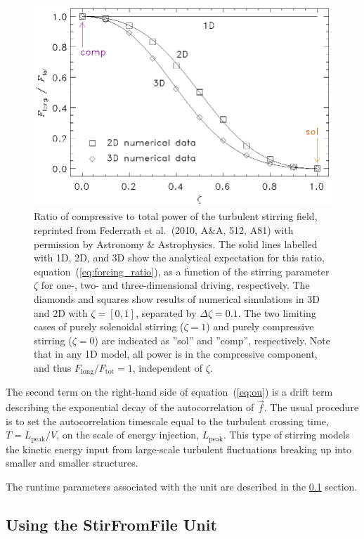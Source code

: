 \begin{figure}[t]
\centerline{\includegraphics[width=0.6\linewidth]{federrath_stirring_ratio}}
\caption{Ratio of compressive to total power of the turbulent stirring field, reprinted from Federrath
et al.~(2010, A\&A, 512, A81) with permission by Astronomy \& Astrophysics. The solid lines labelled
with 1D, 2D, and 3D show the analytical expectation for this ratio, equation~(\ref{eq:forcing_ratio}),
as a function of the stirring parameter $\zeta$ for one-, two- and three-dimensional driving,
respectively. The diamonds and squares show results of numerical simulations in 3D and 2D with
$\zeta=[0,1]$, separated by $\Delta\zeta=0.1$. The two limiting cases of purely solenoidal stirring
($\zeta=1$) and purely compressive stirring ($\zeta=0$) are indicated as ''sol'' and ''comp'',
respectively. Note that in any 1D model, all power is in the compressive component, and thus
$F_\mathrm{long}/F_\mathrm{tot}=1$, independent of $\zeta$.}
\label{fig:federrath_stirring_ratio}
\end{figure}

The second term on the right-hand side of equation~(\ref{eq:ou}) is a drift term describing the
exponential decay of the autocorrelation of $\vec{f}$. The usual procedure is to set the autocorrelation
timescale equal to the turbulent crossing time, $T=L_\mathrm{peak}/V$, on the scale of energy injection,
$L_\mathrm{peak}$. This type of stirring models the kinetic energy input from large-scale turbulent
fluctuations breaking up into smaller and smaller structures.

The runtime parameters associated with the  unit are described in the
\ref{Sec:StirFromFileUnitUsing} section.


\subsection{Using the StirFromFile Unit}
\label{Sec:StirFromFileUnitUsing}

